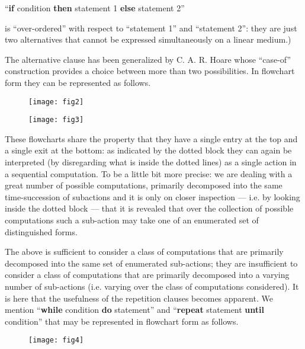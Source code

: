 {
	\setlength{\parindent}{8em}
	\hspace{-.4em}``\textbf{if} condition \textbf{then} statement 1 \textbf{else} statement 2''
}
\medskip

\noindent
is ``over-ordered'' with respect to ``statement 1'' and ``statement 2'': they are just two alternatives that cannot be expressed simultaneously on a linear medium.)

The alternative clause has been generalized by C. A. R. Hoare whose ``case-of'' construction provides a choice between more than two possibilities. In flowchart form they can be represented as follows.

\begin{figure}[ht!]
	\centering
	\texttt{[image: fig2]}
\end{figure}

\begin{figure}[ht!]
	\centering
	\texttt{[image: fig3]}
\end{figure}

These flowcharts share the property that they have a single entry at the top and a single exit at the bottom: as indicated by the dotted block they can again be interpreted (by disregarding what is inside the dotted lines) as a single action in a sequential computation. To be a little bit more precise: we are dealing with a great number of possible computations, primarily decomposed into the same time-succession of subactions and it is only on closer inspection --- i.e. by looking inside the dotted block --- that it is revealed that over the collection of possible computations such a sub-action may take one of an enumerated set of distinguished forms.

The above is sufficient to consider a class of computations that are primarily decomposed into the same set of enumerated sub-actions; they are insufficient to consider a class of computations that are primarily decomposed into a varying number of sub-actions (i.e. varying over the class of computations considered). It is here that the usefulness of the repetition clauses becomes apparent. We mention ``\textbf{while} condition \textbf{do} statement'' and ``\textbf{repeat} statement \textbf{until} condition'' that may be represented in flowchart form as follows.

\begin{figure}[ht!]
	\centering
	\texttt{[image: fig4]}
\end{figure}


